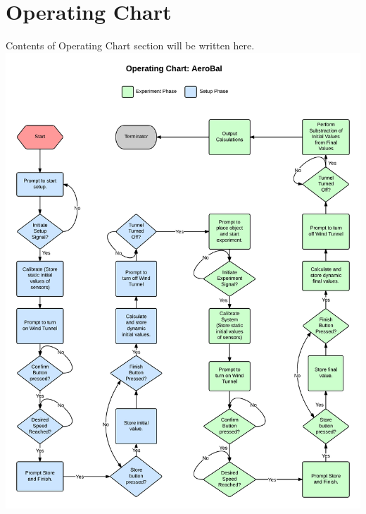 \section{Operating Chart}
	Contents of Operating Chart section will be written here.\\

	\includegraphics[scale=0.19]{img/operating-chart-v1}



\newpage